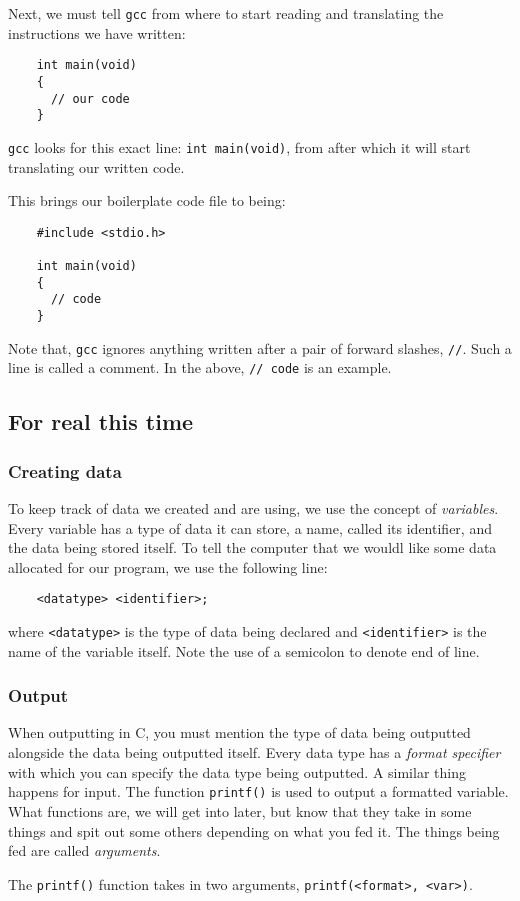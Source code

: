 \documentclass{article}
\newcommand{\gcc}{\Verb|gcc|}
\begin{document}
Next, we must tell \gcc{} from where to start reading and translating the instructions we have
written:
\begin{center}
	\begin{BVerbatim}
	int main(void) 
	{
	  // our code
	}
	\end{BVerbatim}
\end{center}
\gcc{} looks for this exact line: \verb|int main(void)|, from after which it will start translating
our written code.

This brings our boilerplate code file to being:
\begin{center}
	\begin{BVerbatim}
	#include <stdio.h>

	int main(void)
	{
	  // code
	}
	\end{BVerbatim}
\end{center}
Note that, \gcc{} ignores anything written after a pair of forward slashes, \verb|//|. Such a line
is called a comment. In the above, \verb|// code| is an example.

\subsection*{For real this time}
\subsubsection*{Creating data}

To keep track of data we created and are using, we use the concept of \textit{variables}. Every
variable has a type of data it can store, a name, called its identifier, and the data being stored
itself. To tell the computer that we wouldl like some data allocated for our program, we use
the following line:

\begin{center}
	\begin{BVerbatim}
	<datatype> <identifier>;
	\end{BVerbatim}
\end{center}
where \verb|<datatype>| is the type of data being declared and \verb|<identifier>| is the name of
the variable itself. Note the use of a semicolon to denote end of line.

\subsubsection*{Output}
When outputting in C, you must mention the type of data being outputted alongside the data being
outputted itself. Every data type has a \textit{format specifier} with which you can specify the
data type being outputted. A similar thing happens for input. The function \verb|printf()| is used
to output a formatted variable. What functions are, we will get into later, but know that they
take in some things and spit out some others depending on what you fed it. The things being fed
are called \textit{arguments}.

The \verb|printf()| function takes in two arguments, \verb|printf(<format>, <var>)|.
\end{document}
